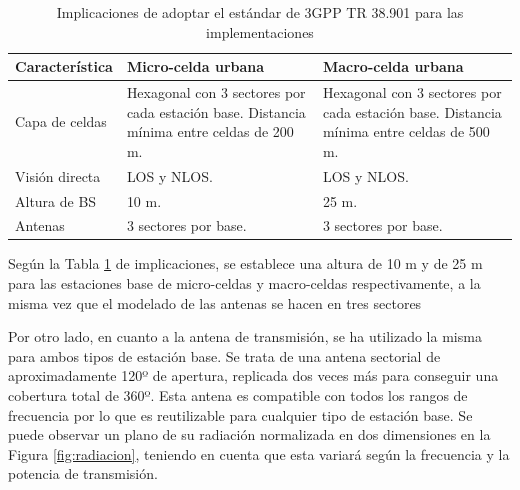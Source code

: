 \begin{table}[h!]
\centering
\caption{Implicaciones de adoptar el estándar de 3GPP TR 38.901 para las implementaciones}
\label{tab:tr38901}
\begin{tabular}{|l|m{4cm}|m{4cm}|} \hline
\textbf{Característica} & \textbf{Micro-celda urbana}                                                              & \textbf{Macro-celda urbana}                                                              \\ \hline
Capa de celdas          & Hexagonal con 3 sectores por cada estación base. Distancia mínima entre celdas de 200 m. & Hexagonal con 3 sectores por cada estación base. Distancia mínima entre celdas de 500 m. \\ \hline
Visión directa          & LOS y NLOS.                                                                              & LOS y NLOS.                                                                              \\ \hline
Altura de BS            & 10 m.                                                                                    & 25 m.                                                                                    \\ \hline
Antenas                 & 3 sectores por base.                                                                     & 3 sectores por base.                                                             \\ \hline       
\end{tabular}
\end{table}

Según la Tabla \ref{tab:tr38901} de implicaciones, se establece una altura de 10 m y de 25 m para las estaciones base de micro-celdas y macro-celdas respectivamente, a la misma vez que el modelado de las antenas se hacen en tres sectores 

Por otro lado, en cuanto a la antena de transmisión, se ha utilizado la misma para ambos tipos de estación base. Se trata de una antena sectorial de aproximadamente 120º de apertura, replicada dos veces más para conseguir una cobertura total de 360º. Esta antena es compatible con todos los rangos de frecuencia por lo que es reutilizable para cualquier tipo de estación base. Se puede observar un plano de su radiación normalizada en dos dimensiones en la Figura \ref{fig:radiacion}, teniendo en cuenta que esta variará según la frecuencia y la potencia de transmisión.

